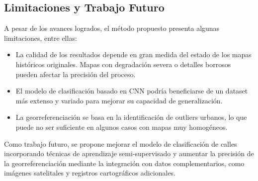 \documentclass[twocolumn, fontsize=10pt]{article}
\begin{document}
\subsection{Limitaciones y Trabajo Futuro}

A pesar de los avances logrados, el m\'etodo propuesto presenta algunas limitaciones, entre ellas:

\begin{itemize}
    \item La calidad de los resultados depende en gran medida del estado de los mapas hist\'oricos originales. Mapas con degradaci\'on severa o detalles borrosos pueden afectar la precisi\'on del proceso.
    \item El modelo de clasificaci\'on basado en CNN podr\'ia beneficiarse de un dataset m\'as extenso y variado para mejorar su capacidad de generalizaci\'on.
    \item La georreferenciaci\'on se basa en la identificaci\'on de outliers urbanos, lo que puede no ser suficiente en algunos casos con mapas muy homog\'eneos.
\end{itemize}

Como trabajo futuro, se propone mejorar el modelo de clasificaci\'on de calles incorporando t\'ecnicas de aprendizaje semi-supervisado y aumentar la precisi\'on de la georreferenciaci\'on mediante la integraci\'on con datos complementarios, como im\'agenes satelitales y registros cartogr\'aficos adicionales.




\renewcommand\refname{Referencias}
\end{document}
